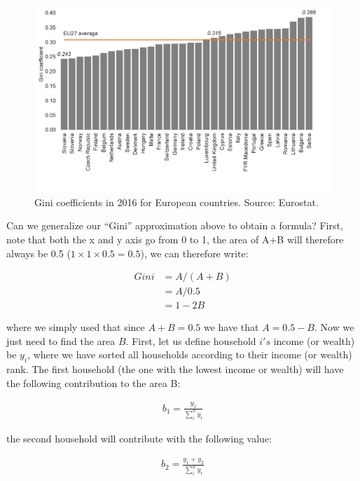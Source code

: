 \documentclass[]{book}
\begin{document}
\begin{figure}

{\centering \includegraphics[width=0.9\linewidth]{_resources/chapter_inequality/ex7} 

}

\caption{Gini coefficients in 2016 for European countries. Source: Eurostat.}\label{fig:poverty3}
\end{figure}

Can we generalize our ``Gini'' approximation above to obtain a formula? First, note that both the x and y axis go from 0 to 1, the area of A+B will therefore always be 0.5 (\(1\times 1\times 0.5=0.5\)), we can therefore write:

\begin{align}
    Gini&=A/(A+B)\nonumber\\
    &=A/0.5\nonumber\\
    &=1-2B
\end{align}

where we simply used that since \(A+B=0.5\) we have that \(A=0.5-B\). Now we just need to find the area \(B\). First, let us define household \(i's\) income (or wealth) be \(y_i\), where we have sorted all households according to their income (or wealth) rank. The first household (the one with the lowest income or wealth) will have the following contribution to the area B:

\begin{align}
  b_1=\frac{y_1}{\sum_i^ny_i}
\end{align}

the second household will contribute with the following value:

\begin{align}
  b_2=\frac{y_1+y_2}{\sum_i^ny_i}
\end{align}
\end{document}
